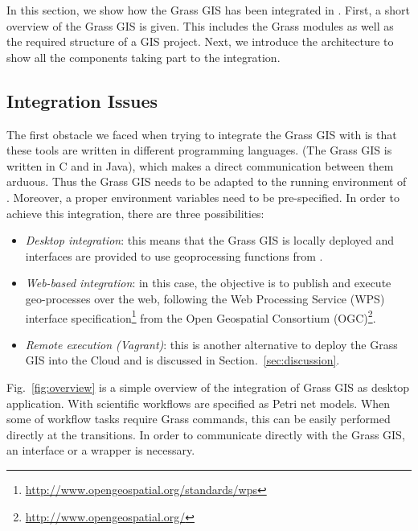 %
%
\label{sec:grassintegration}
In this section, we show how the Grass GIS has been integrated in \Renew{}.
%
First, a short overview of the Grass GIS is given. 
%
This includes the Grass modules as well as the required structure of a GIS project. 
%
Next, we introduce the architecture to show all the components taking part to the integration.
%

\subsection{Integration Issues}
%
The first obstacle we faced when trying to integrate the Grass GIS with \Renew{} is that these tools are written in different programming languages.
(The Grass GIS is written in C and \Renew{} in Java), which makes a direct communication between them arduous.
%
Thus the Grass GIS needs to be adapted to the running environment of \Renew{}.
%
Moreover, a proper environment variables need to be pre-specified.
%
In order to achieve this integration, there are three possibilities:

\begin{itemize}
 \item
 \emph{Desktop integration}: 
 this means that the Grass GIS is locally deployed and interfaces are provided to use geoprocessing functions from \Renew{}.
\item
 \emph{Web-based integration}: 
 in this case, the objective is to publish and execute geo-processes over the web, following the Web Processing Service (WPS) interface specification\footnote{\url{http://www.opengeospatial.org/standards/wps}} from the Open Geospatial Consortium (OGC)\footnote{\url{http://www.opengeospatial.org/}}.
\item
\emph{Remote execution (Vagrant)}: 
this is another alternative to deploy the Grass GIS into the Cloud and is discussed in Section.~\ref{sec:discussion}.

\end{itemize}

%
%
Fig.~\ref{fig:overview} is a simple overview of the integration of Grass GIS as desktop application. 
%
With \Renew{} scientific workflows are specified as Petri net models. 
%
When some of workflow tasks require Grass commands, this can be easily performed directly at the transitions.
%
In order to communicate directly with the Grass GIS, an interface or a wrapper is necessary. 

